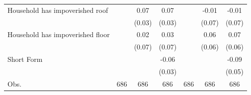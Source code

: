 {\begin{tabular}{l*{6}{c}}
Household has impoverished roof&                     &        0.07\sym{*}  &        0.07\sym{*}  &                     &       -0.01         &       -0.01         \\
                    &                     &      (0.03)         &      (0.03)         &                     &      (0.07)         &      (0.07)         \\
Household has impoverished floor&                     &        0.02         &        0.03         &                     &        0.06         &        0.07         \\
                    &                     &      (0.07)         &      (0.07)         &                     &      (0.06)         &      (0.06)         \\
Short Form          &                     &                     &       -0.06         &                     &                     &       -0.09         \\
                    &                     &                     &      (0.03)         &                     &                     &      (0.05)         \\
\hline
Obs.                &         686         &         686         &         686         &         686         &         686         &         686         \\
\hline\hline
\end{tabular}
}
